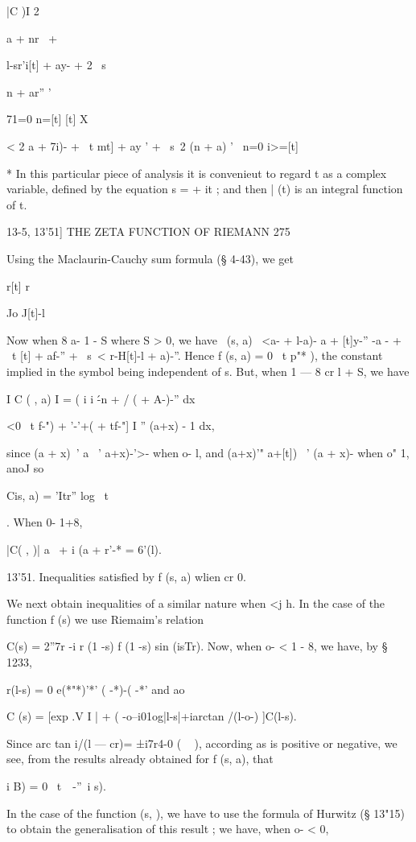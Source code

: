 |C  )I  2 \ \ {a + nr \ + \ \ { l-sr'i[t] + ay-   +  2 \ s\ \ {n + ar'' ' 

71=0 n=[t] 
[t] X 

< 2  a + 7i)-  + \ t mt] + ay '  + \ s\ 2 (n + a) '  \ 
n=0 i>=[t] 

* In this particular piece of analysis it is convenieut to regard t as a complex variable, 
defined by the equation s =   + it ; and then | (t) is an integral function of t. 



13-5, 13'51] THE ZETA FUNCTION OF RIEMANN 275 

Using the Maclaurin-Cauchy sum formula (§ 4-43), we get 

r[t] r  

Jo J[t]-l 

Now when 8   a-   1 - S where S > 0, we have 
\  (s, a) \ <a- + l-a)-  a + [t]y-'' -a -   + \ t     [t] + af-'' + \ s\ < r-H[t]-l + a)-''. 
Hence f (s, a) = 0 \ t p"* ), the constant implied in the symbol being independent of s. 
But, when 1 — 8 cr l + S, we have 

I C ( , a) I = ( i i \'-n + /   (  + A-)-'' dx 

<0 \ t f-") +   '-'+(  + tf-"] I '' (a+x) - 1 dx, 

since (a + x)~' a ~'   a+x)-'>- when o- l, and (a+x)'"  a+[t]) ~'  (a + x)-  when 
o"   1, anoJ so 

Cis, a) =  'Itr'' log \ t\ \ }. 
When 0- 1+8, 

|C( ,  )| a~ + i (a +  r'-* = 6'(l). 

13'51. Inequalities satisfied by f (s, a) wlien cr   0. 

We next obtain inequalities of a similar nature when <j  h. In the case of the 
function f (s) we use Riemaim's relation 

C(s) = 2''7r -i r (1 -s) f (1 -s) sin (isTr). 
Now, when o- < 1 - 8, we have, by § 1233, 

r(l-s) = 0 e(*"*)'*' ( -*)-( -*'  
and ao 

C (s) = [exp  .V I   | + ( -o--i01og|l-s|+iarctan /(l-o-) ]C(l-s). 

Since arc tan i/(l — cr)= ±i7r4-0 ( ~ ), according as   is positive or negative, we see, from 
the results already obtained for f (s, a), that 

i B) = 0 \ t\ \  -''\ i  s). 

In the case of the function   (s,  ), we have to use the formula of Hurwitz (§ 13"15) 
to obtain the generalisation of this result ; we have, when o- < 0, 

}}
